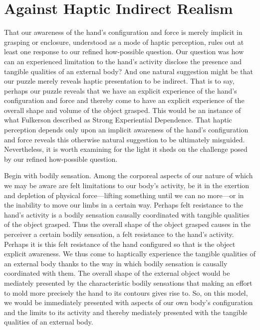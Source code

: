 
\section{Against Haptic Indirect Realism} %
\label{sec:against_haptic_indirect_realism}

That our awareness of the hand's configuration and force is merely implicit in grasping or enclosure, understood as a mode of haptic perception, rules out at least one response to our refined how-possible question. Our question was how can an experienced limitation to the hand's activity disclose the presence and tangible qualities of an external body? And one natural suggestion might be that our puzzle merely reveals haptic presentation to be indirect. That is to say, perhaps our puzzle reveals that we have an explicit experience of the hand's configuration and force and thereby come to have an explicit experience of the overall shape and volume of the object grasped. This would be an instance of what Fulkerson described as Strong Experiential Dependence. That haptic perception depends only upon an implicit awareness of the hand's configuration and force reveals this otherwise natural suggestion to be ultimately misguided. Nevertheless, it is worth examining for the light it sheds on the challenge posed by our refined how-possible question.

Begin with bodily sensation. Among the corporeal aspects of our nature of which we may be aware are felt limitations to our body's activity, be it in the exertion and depletion of physical force---lifting something until we can no more---or in the inability to move our limbs in a certain way. Perhaps felt resistance to the hand's activity is a bodily sensation causally coordinated with tangible qualities of the object grasped. Thus the overall shape of the object grasped causes in the perceiver a certain bodily sensation, a felt resistance to the hand's activity. Perhaps it is this felt resistance of the hand configured so that is the object explicit awareness. We thus come to haptically experience the tangible qualities of an external body thanks to the way in which bodily sensation is causally coordinated with them. The overall shape of the external object would be mediately presented by the characteristic bodily sensations that making an effort to mold more precisely the hand to its contours gives rise to. So, on this model, we would be immediately presented with aspects of our own body's configuration and the limits to its activity and thereby mediately presented with the tangible qualities of an external body.

